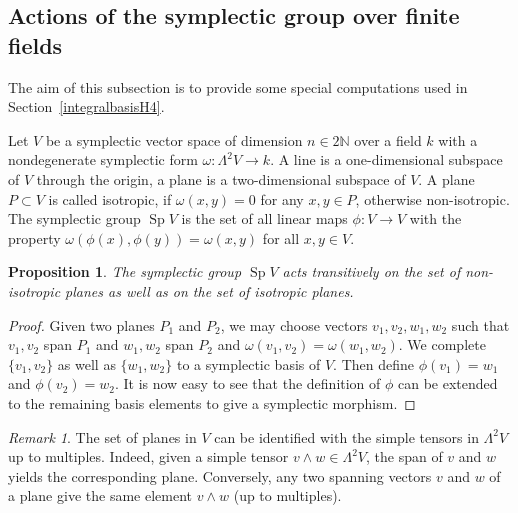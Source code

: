 \documentclass{alggeom}
\DeclareMathOperator{\Sp}{Sp}
\theoremstyle{plain}
\newtheorem{proposition}[theorem]{Proposition}
\theoremstyle{definition}
\theoremstyle{remark}
\newtheorem{remark}[theorem]{Remark}
\begin{document}
\subsection{Actions of the symplectic group over finite fields}\label{Section_Symplectic}
The aim of this subsection is to provide some special computations used in Section~\ref{integralbasisH4}.

Let $V$ be a symplectic vector space of dimension $n\in 2\mathbb{N}$ over a field $k$ with a nondegenerate symplectic form $\omega : \Lambda^2 V \rightarrow k$. A line is a one-dimensional subspace of $V$ through the origin, a plane is a two-dimensional subspace of $V$. A plane $P\subset V$ is called isotropic, if $\omega (x,y)=0$ for any $x,y\in P$, otherwise non-isotropic.  The symplectic group $\Sp V$ is the set of all linear maps $\phi : V\rightarrow V$ with the property $\omega(\phi(x),\phi(y)) = \omega(x,y)$ for all $ x,y\in V$.
\begin{proposition}\label{transitively}
The symplectic group $\Sp V$ acts transitively on the set of non-isotropic planes as well as on the set of isotropic planes.
\end{proposition}
\begin{proof}
Given two planes $P_1$ and $P_2$, we may choose vectors $v_1,v_2,w_1,w_2$ such that $v_1,v_2$ span $P_1$ and $w_1,w_2$ span $P_2$ and $\omega(v_1,v_2) =\omega(w_1,w_2)$. We complete $\{v_1,v_2\}$ as well as $\{w_1,w_2\}$ to a symplectic basis of $V$.
Then define $\phi(v_1)=w_1$ and $\phi(v_2)=w_2$. 
It is now easy to see that the definition of $\phi$ can be extended to the remaining basis elements to give a symplectic morphism.
\end{proof}
\begin{remark} \label{simplePlanes}
The set of planes in $V$ can be identified with the simple tensors in $\Lambda^2V$ up to multiples. Indeed, given a simple tensor $v\wedge w \in \Lambda^2 V$, the span of $v$ and $w$ yields the corresponding plane. Conversely, any two spanning vectors $v$ and $w$ of a plane give the same element $v\wedge w$ (up to multiples).
\end{remark}
\end{document}
